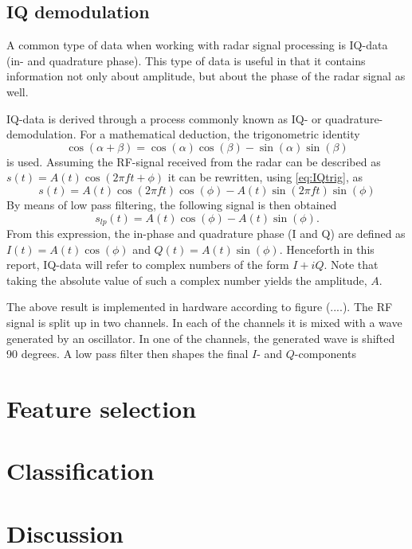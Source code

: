 \documentclass[a4paper, 12pt]{article}
\begin{document}
\subsection{IQ demodulation}
A common type of data when working with radar signal processing is IQ-data (in- and quadrature phase).  This type of data is useful in that it contains information not only about amplitude, but about the phase of the radar signal as well. 

IQ-data is derived through a process commonly known as IQ- or quadrature-demodulation. For a mathematical deduction, the trigonometric identity
\begin{equation}
	\label{eq:IQtrig}
	\cos(\alpha+\beta) = \cos(\alpha)\cos(\beta)-\sin(\alpha)\sin(\beta)
\end{equation}
is used. Assuming the RF-signal received from the radar can be described as $s(t) = A(t)\cos(2\pi ft+\phi)$ it can be rewritten, using \eqref{eq:IQtrig}, as 
\begin{equation}
	s(t)=A(t)\cos(2\pi ft)\cos(\phi)-A(t)\sin(2\pi ft)\sin(\phi)
\end{equation}
By means of low pass filtering, the following signal is then obtained
\begin{equation}
	s_{lp}(t)=A(t)\cos(\phi)-A(t)\sin(\phi).
\end{equation}
From this expression, the in-phase and quadrature phase (I and Q) are defined as $I(t)=A(t)\cos(\phi)$ and $Q(t)=A(t)\sin(\phi)$. Henceforth in this report, IQ-data will refer to complex numbers of the form $I+i Q$. Note that taking the absolute value of such a complex number yields the amplitude, $A$.

The above result is implemented in hardware according to figure (....). The RF signal is split up in two channels. In each of the channels it is mixed with a wave generated by an oscillator. In one of the channels, the generated wave is shifted 90 degrees. A low pass filter then shapes the final $I$- and $Q$-components



\section{Feature selection}

\section{Classification}

\section{Discussion}
\end{document}
